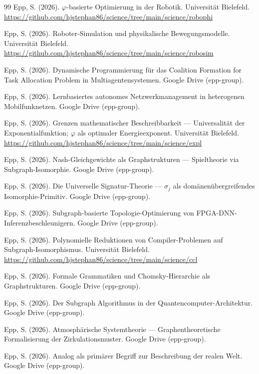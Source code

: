 ﻿\documentclass[a4paper,12pt]{article}
\theoremstyle{definition}
\begin{document}
\begin{thebibliography}{99}
Epp, S. (2026).
$\varphi$-basierte Optimierung in der Robotik.
Universit\"at Bielefeld.
\url{https://github.com/hjstephan86/science/tree/main/science/robophi}

Epp, S. (2026).
Roboter-Simulation und physikalische Bewegungsmodelle.
Universit\"at Bielefeld.
\url{https://github.com/hjstephan86/science/tree/main/science/robosim}

Epp, S. (2026).
Dynamische Programmierung f\"ur das Coalition Formation
for Task Allocation Problem in Multiagentensystemen.
Google Drive (epp-group).

Epp, S. (2026).
Lernbasiertes autonomes Netzwerkmanagement in heterogenen Mobilfunknetzen.
Google Drive (epp-group).

Epp, S. (2026).
Grenzen mathematischer Beschreibbarkeit ---
Universalit\"at der Exponentialfunktion; $\varphi$ als optimaler Energieexponent.
Universit\"at Bielefeld.
\url{https://github.com/hjstephan86/science/tree/main/science/expl}

Epp, S. (2026).
Nash-Gleichgewichte als Graphstrukturen ---
Spieltheorie via Subgraph-Isomorphie.
Google Drive (epp-group).

Epp, S. (2026).
Die Universelle Signatur-Theorie ---
$\sigma_j$ als dom\"anen\"ubergreifendes Isomorphie-Primitiv.
Google Drive (epp-group).

Epp, S. (2026).
Subgraph-basierte Topologie-Optimierung von FPGA-DNN-Inferenzbeschleunigern.
Google Drive (epp-group).

Epp, S. (2026).
Polynomielle Reduktionen von Compiler-Problemen auf Subgraph-Isomorphismus.
Universit\"at Bielefeld.
\url{https://github.com/hjstephan86/science/tree/main/science/ccl}

Epp, S. (2026).
Formale Grammatiken und Chomsky-Hierarchie als Graphstrukturen.
Google Drive (epp-group).

Epp, S. (2026).
Der Subgraph Algorithmus in der Quantencomputer-Architektur.
Google Drive (epp-group).

Epp, S. (2026).
Atmosph\"arische Systemtheorie ---
Graphentheoretische Formalisierung der Zirkulationsmuster.
Google Drive (epp-group).

Epp, S. (2026).
Analog als prim\"arer Begriff zur Beschreibung der realen Welt.
Google Drive (epp-group).


\end{thebibliography}
\end{document}
